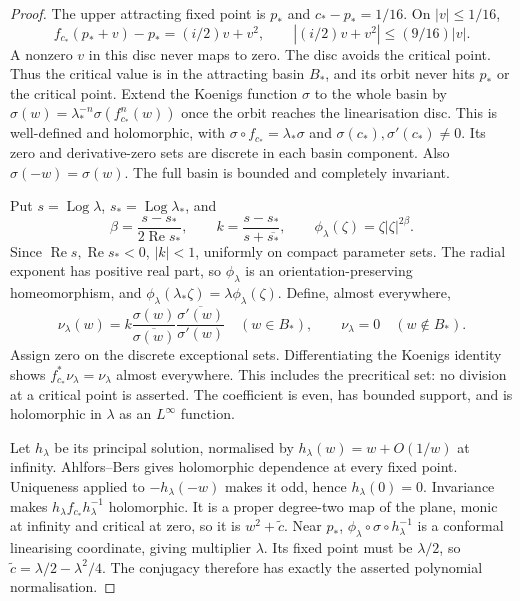 \documentclass[11pt]{article}
\newcommand{\re}{\operatorname{Re}}
\newcommand{\Log}{\operatorname{Log}}
\begin{document}
\begin{proof}
The upper attracting fixed point is $p_*$ and
$c_*-p_*=1/16$. On $|v|\le1/16$,
\[
 f_{c_*}(p_*+v)-p_*=(i/2)v+v^2,\qquad
 |(i/2)v+v^2|\le(9/16)|v|.
\]
A nonzero $v$ in this disc never maps to zero. The disc avoids the
critical point. Thus the critical value is in the attracting basin
$B_*$, and its orbit never hits $p_*$ or the critical point.
Extend the Koenigs function $\sigma$ to the whole basin by
$\sigma(w)=\lambda_*^{-n}\sigma(f_{c_*}^n(w))$ once the orbit reaches
the linearisation disc. This is well-defined and holomorphic, with
$\sigma\circ f_{c_*}=\lambda_*\sigma$ and
$\sigma(c_*),\sigma'(c_*)\ne0$. Its zero and derivative-zero sets
are discrete in each basin component. Also $\sigma(-w)=\sigma(w)$.
The full basin is bounded and completely invariant.

Put $s=\Log\lambda$, $s_*=\Log\lambda_*$, and
\[
 \beta=\frac{s-s_*}{2\re s_*},\qquad
 k=\frac{s-s_*}{s+\overline{s_*}},\qquad
 \phi_\lambda(\zeta)=\zeta|\zeta|^{2\beta}.
\]
Since $\re s,\re s_*<0$, $|k|<1$, uniformly on compact parameter sets.
The radial exponent has positive real part, so $\phi_\lambda$ is an
orientation-preserving homeomorphism, and
$\phi_\lambda(\lambda_*\zeta)=\lambda\phi_\lambda(\zeta)$.
Define, almost everywhere,
\[
 \nu_\lambda(w)=
 k\frac{\sigma(w)}{\overline{\sigma(w)}}
   \frac{\overline{\sigma'(w)}}{\sigma'(w)}\quad(w\in B_*),
 \qquad \nu_\lambda=0\quad(w\notin B_*).
\]
Assign zero on the discrete exceptional sets. Differentiating the
Koenigs identity shows
$f_{c_*}^*\nu_\lambda=\nu_\lambda$ almost everywhere. This includes
the precritical set: no division at a critical point is asserted.
The coefficient is even, has bounded support, and is holomorphic in
$\lambda$ as an $L^\infty$ function.

Let $h_\lambda$ be its principal solution, normalised by
$h_\lambda(w)=w+O(1/w)$ at infinity. Ahlfors--Bers gives holomorphic
dependence at every fixed point. Uniqueness applied to
$-h_\lambda(-w)$ makes it odd, hence $h_\lambda(0)=0$.
Invariance makes $h_\lambda f_{c_*}h_\lambda^{-1}$ holomorphic.
It is a proper degree-two map of the plane, monic at infinity and
critical at zero, so it is $w^2+\widetilde c$.
Near $p_*$, $\phi_\lambda\circ\sigma\circ h_\lambda^{-1}$ is a
conformal linearising coordinate, giving multiplier $\lambda$.
Its fixed point must be $\lambda/2$, so
$\widetilde c=\lambda/2-\lambda^2/4$. The conjugacy therefore has
exactly the asserted polynomial normalisation.


\end{proof}
\end{document}
